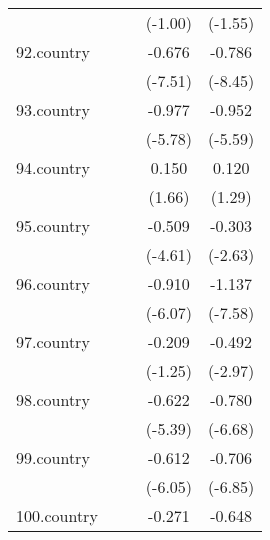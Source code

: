{\begin{tabular}{l*{4}{c}}
            &                     &                     &     (-1.00)         &     (-1.55)         \\
[1em]
92.country  &                     &                     &      -0.676\sym{***}&      -0.786\sym{***}\\
            &                     &                     &     (-7.51)         &     (-8.45)         \\
[1em]
93.country  &                     &                     &      -0.977\sym{***}&      -0.952\sym{***}\\
            &                     &                     &     (-5.78)         &     (-5.59)         \\
[1em]
94.country  &                     &                     &       0.150         &       0.120         \\
            &                     &                     &      (1.66)         &      (1.29)         \\
[1em]
95.country  &                     &                     &      -0.509\sym{***}&      -0.303\sym{**} \\
            &                     &                     &     (-4.61)         &     (-2.63)         \\
[1em]
96.country  &                     &                     &      -0.910\sym{***}&      -1.137\sym{***}\\
            &                     &                     &     (-6.07)         &     (-7.58)         \\
[1em]
97.country  &                     &                     &      -0.209         &      -0.492\sym{**} \\
            &                     &                     &     (-1.25)         &     (-2.97)         \\
[1em]
98.country  &                     &                     &      -0.622\sym{***}&      -0.780\sym{***}\\
            &                     &                     &     (-5.39)         &     (-6.68)         \\
[1em]
99.country  &                     &                     &      -0.612\sym{***}&      -0.706\sym{***}\\
            &                     &                     &     (-6.05)         &     (-6.85)         \\
[1em]
100.country &                     &                     &      -0.271\sym{**} &      -0.648\sym{***}\\

\end{tabular}}
